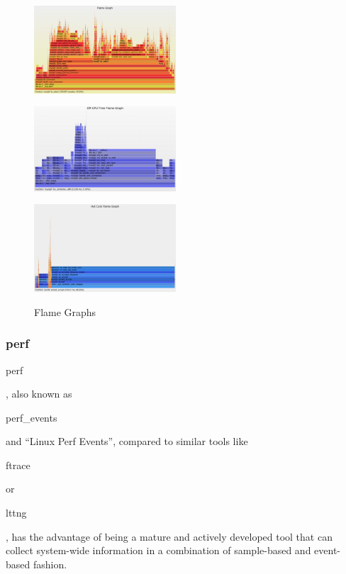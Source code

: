 \documentclass[10pt]{article}
\begin{document}
\begin{figure}
\begin{minipage}[b]{.3\linewidth}
\centering%
\includegraphics[width=150pt]{images/oncpu}
\label{fig:1a}
\end{minipage}%
\hfill%
\begin{minipage}[b]{.3\linewidth}
\centering%
\includegraphics[width=150pt]{images/offcpu}
\label{fig:1b}
\end{minipage}
\hfill%
\begin{minipage}[b]{.3\linewidth}
\centering%
\includegraphics[width=150pt]{images/hotcold}
\label{fig:1c}
\end{minipage}
\caption{Flame Graphs}\label{fig:flamegraph}
\end{figure}

\subsubsection{perf}

\begin{tt}perf\end{tt}, also known as \begin{tt}perf\_events\end{tt} and
``Linux Perf Events'', compared to similar tools like \begin{tt}ftrace\end{tt} or
\begin{tt}lttng\end{tt}, has the advantage of being a mature and actively
developed tool that can collect system-wide information in a combination of
sample-based and event-based fashion.
\end{document}
